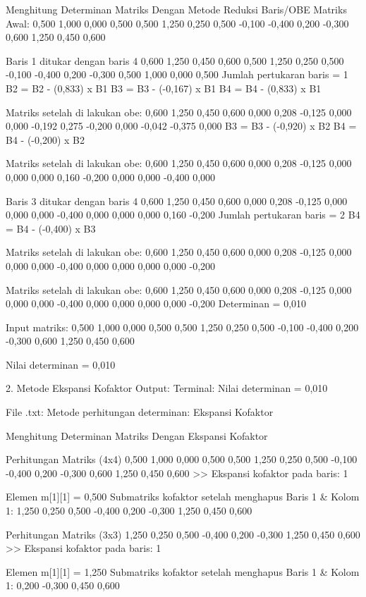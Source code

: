 \documentclass[12pt]{article}
\begin{document}
\begin{enumerate}
\begin{keluaran}
Menghitung Determinan Matriks Dengan Metode Reduksi Baris/OBE
Matriks Awal:
0,500 1,000 0,000 0,500 
0,500 1,250 0,250 0,500 
-0,100 -0,400 0,200 -0,300 
0,600 1,250 0,450 0,600 

Baris 1 ditukar dengan baris 4
0,600 1,250 0,450 0,600 
0,500 1,250 0,250 0,500 
-0,100 -0,400 0,200 -0,300 
0,500 1,000 0,000 0,500 
Jumlah pertukaran baris = 1
B2 = B2 - (0,833) x B1
B3 = B3 - (-0,167) x B1
B4 = B4 - (0,833) x B1

Matriks setelah di lakukan obe: 
0,600 1,250 0,450 0,600 
0,000 0,208 -0,125 0,000 
0,000 -0,192 0,275 -0,200 
0,000 -0,042 -0,375 0,000 
B3 = B3 - (-0,920) x B2
B4 = B4 - (-0,200) x B2

Matriks setelah di lakukan obe: 
0,600 1,250 0,450 0,600 
0,000 0,208 -0,125 0,000 
0,000 0,000 0,160 -0,200 
0,000 0,000 -0,400 0,000 

Baris 3 ditukar dengan baris 4
0,600 1,250 0,450 0,600 
0,000 0,208 -0,125 0,000 
0,000 0,000 -0,400 0,000 
0,000 0,000 0,160 -0,200 
Jumlah pertukaran baris = 2
B4 = B4 - (-0,400) x B3

Matriks setelah di lakukan obe: 
0,600 1,250 0,450 0,600 
0,000 0,208 -0,125 0,000 
0,000 0,000 -0,400 0,000 
0,000 0,000 0,000 -0,200 

Matriks setelah di lakukan obe: 
0,600 1,250 0,450 0,600 
0,000 0,208 -0,125 0,000 
0,000 0,000 -0,400 0,000 
0,000 0,000 0,000 -0,200 
Determinan = 0,010

Input matriks:
0,500	1,000	0,000	0,500
0,500	1,250	0,250	0,500
-0,100	-0,400	0,200	-0,300
0,600	1,250	0,450	0,600

Nilai determinan = 0,010

2. Metode Ekspansi Kofaktor
Output:
Terminal:
Nilai determinan = 0,010

File .txt:
Metode perhitungan determinan: Ekspansi Kofaktor

Menghitung Determinan Matriks Dengan Ekspansi Kofaktor

Perhitungan Matriks (4x4)
0,500 1,000 0,000 0,500 
0,500 1,250 0,250 0,500 
-0,100 -0,400 0,200 -0,300 
0,600 1,250 0,450 0,600 
>> Ekspansi kofaktor pada baris: 1

Elemen m[1][1] = 0,500
Submatriks kofaktor setelah menghapus Baris 1 & Kolom 1:
1,250 0,250 0,500 
-0,400 0,200 -0,300 
1,250 0,450 0,600 

Perhitungan Matriks (3x3)
1,250 0,250 0,500 
-0,400 0,200 -0,300 
1,250 0,450 0,600 
>> Ekspansi kofaktor pada baris: 1

Elemen m[1][1] = 1,250
Submatriks kofaktor setelah menghapus Baris 1 & Kolom 1:
0,200 -0,300 
0,450 0,600 


\end{keluaran}
\end{enumerate}
\end{document}
